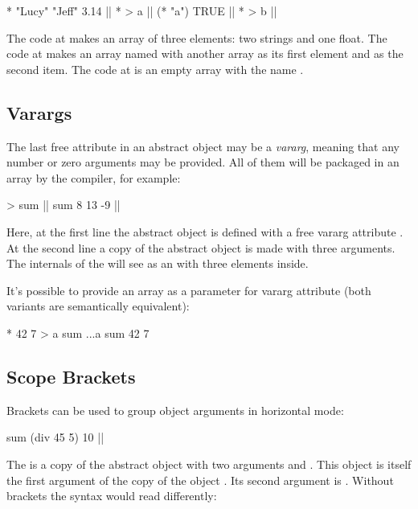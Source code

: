 \begin{ffcode}
* "Lucy" "Jeff" 3.14 |$\label{ln:array-1}$|
* > a |$\label{ln:array-2a}$|
  (* "a")
  TRUE |$\label{ln:array-2b}$|
* > b |$\label{ln:array-3}$|
\end{ffcode}

The code at  makes an array of three elements: two strings
and one float. The code at  makes an array named  with another
array as its first element and  as the second item.
The code at  is an empty array with the name .

\subsection{Varargs}

The last free attribute in an abstract object may be a \emph{vararg},
meaning that any number or zero arguments may be provided. All of them
will be packaged in an array by the compiler, for example:

\begin{ffcode}
[x...] > sum |$\label{ln:sum-def}$|
sum 8 13 -9 |$\label{ln:sum-instance}$|
\end{ffcode}

Here, at the first line the abstract object  is defined
with a free vararg attribute . At the second line a copy of the
abstract object is made with three arguments. The internals of
the  will see  as an  with three
elements inside.

It's possible to provide an array as a parameter for vararg attribute
(both variants are semantically equivalent):

\begin{ffcode}
* 42 7 > a
sum ...a
sum 42 7
\end{ffcode}

\subsection{Scope Brackets}

Brackets can be used to group object arguments in horizontal mode:

\begin{ffcode}
sum (div 45 5) 10  |$\label{ln:sum}$|
\end{ffcode}

The  is a copy of the abstract object 
with two arguments  and . This object is itself
the first argument of the copy of the object . Its second
argument is . Without brackets the syntax would read differently:

